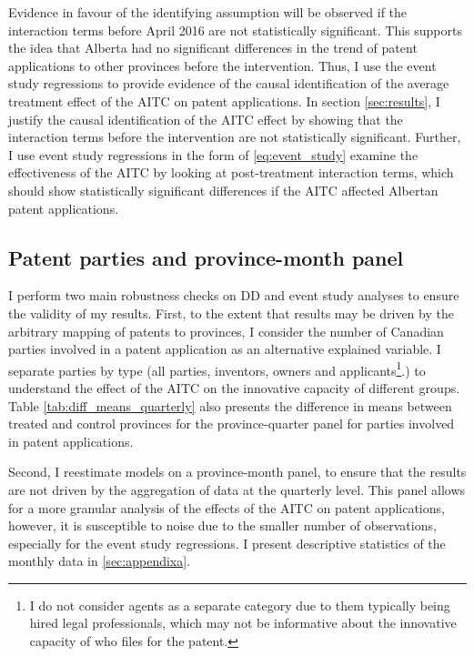 \documentclass[../main.tex]{subfiles}
\begin{document}
Evidence in favour of the identifying assumption will be observed if the interaction terms before April 2016 are not statistically significant. This supports the idea that Alberta had no significant differences in the trend of patent applications to other provinces before the intervention. Thus, I use the event study regressions to provide evidence of the causal identification of the average treatment effect of the AITC on patent applications. In section \ref{sec:results}, I justify the causal identification of the AITC effect by showing that the interaction terms before the intervention are not statistically significant. Further, I use event study regressions in the form of \ref{eq:event_study} examine the effectiveness of the AITC by looking at post-treatment interaction terms, which should show statistically significant differences if the AITC affected Albertan patent applications.

\subsection{Patent parties and province-month panel}

I perform two main robustness checks on DD and event study analyses to ensure the validity of my results. First, to the extent that results may be driven by the arbitrary mapping of patents to provinces, I consider the number of Canadian parties involved in a patent application as an alternative explained variable. I separate parties by type (all parties, inventors, owners and applicants\footnote{I do not consider agents as a separate category due to them typically being hired legal professionals, which may not be informative about the innovative capacity of who files for the patent.}.) to understand the effect of the AITC on the innovative capacity of different groups. Table \ref{tab:diff_means_quarterly} also presents the difference in means between treated and control provinces for the province-quarter panel for parties involved in patent applications.

Second, I reestimate models on a province-month panel, to ensure that the results are not driven by the aggregation of data at the quarterly level. This panel allows for a more granular analysis of the effects of the AITC on patent applications, however, it is susceptible to noise due to the smaller number of observations, especially for the event study regressions. I present descriptive statistics of the monthly data in \ref{sec:appendixa}. 
\end{document}

